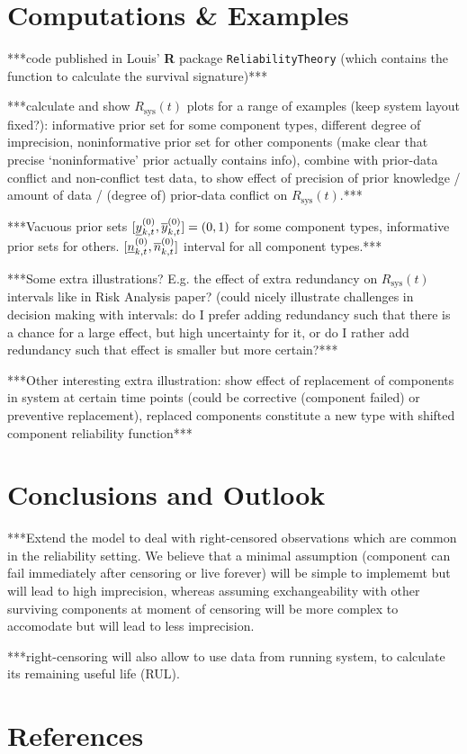 \documentclass[authoryear, 12pt, a4paper]{elsarticle}
\newcommand{\Rsys}{R_\text{sys}}
\begin{document}
\section{Computations \& Examples}

***code published in Louis' \textbf{R} package \texttt{ReliabilityTheory}
(which contains the function to calculate the survival signature)***


***calculate and show $\Rsys(t)$ plots for a range of examples (keep system layout fixed?):
informative prior set for some component types, different degree of imprecision,
noninformative prior set for other components (make clear that precise `noninformative' prior actually contains info), 
combine with prior-data conflict and non-conflict test data,
to show effect of precision of prior knowledge / amount of data / (degree of) prior-data conflict on $\Rsys(t)$.***

***Vacuous prior sets $[\underline{y}^{(0)}_{k,t}, \overline{y}^{(0)}_{k,t}] = (0,1)$ for some component types,
informative prior sets for others. $[\underline{n}^{(0)}_{k,t}, \overline{n}^{(0)}_{k,t}]$ interval for all component types.***

***Some extra illustrations? E.g. the effect of extra redundancy on $\Rsys(t)$ intervals like in Risk Analysis paper?
(could nicely illustrate challenges in decision making with intervals:
do I prefer adding redundancy such that there is a chance for a large effect, but high uncertainty for it,
or do I rather add redundancy such that effect is smaller but more certain?***

***Other interesting extra illustration:
show effect of replacement of components in system at certain time points
(could be corrective (component failed) or preventive replacement),
replaced components constitute a new type with shifted component reliability function***


\section{Conclusions and Outlook}

***Extend the model to deal with right-censored observations which are common in the reliability setting.
We believe that a minimal assumption (component can fail immediately after censoring or live forever)
will be simple to implememt but will lead to high imprecision,
whereas assuming exchangeability with other surviving components at moment of censoring
will be more complex to accomodate but will lead to less imprecision.

***right-censoring will also allow to use data from running system,
to calculate its remaining useful life (RUL).




\section*{References}



\end{document}
